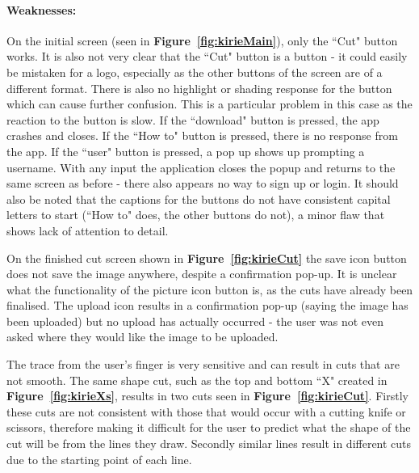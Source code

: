 \documentclass[11pt]{article}
\begin{document}
                
                \paragraph{Weaknesses:}
                On the initial screen (seen in \textbf{Figure~\ref{fig:kirieMain}}), only the ``Cut" button works. It is also not very clear that the ``Cut" button is a button - it could easily be  mistaken for a logo, especially as the other buttons of the screen are of a different format. There is also no highlight or shading response for the button which can cause further confusion. This is a particular problem in this case as the reaction to the button is slow. If the ``download" button is pressed, the app crashes and closes. If the ``How to" button is pressed, there is no response from the app. If the ``user" button is pressed, a pop up shows up prompting a username. With any input the application closes the popup and returns to the same screen as before - there also appears no way to sign up or login. It should also be noted that the captions for the buttons do not have consistent capital letters to start (``How to" does, the other buttons do not), a minor flaw that shows lack of attention to detail.
                
                On the finished cut screen shown in \textbf{Figure~\ref{fig:kirieCut}} the save icon button does not save the image anywhere, despite a confirmation pop-up. It is unclear what the functionality of the picture icon button is, as the cuts have already been finalised. The upload icon results in a confirmation pop-up (saying the image has been uploaded) but no upload has actually occurred - the user was not even asked where they would like the image to be uploaded. 
                
                The trace from the user's finger is very sensitive and can result in cuts that are not smooth. The same shape cut, such as the top and bottom ``X" created in \textbf{Figure~\ref{fig:kirieXs}}, results in two cuts seen in \textbf{Figure~\ref{fig:kirieCut}}. Firstly these cuts are not consistent with those that would occur with a cutting knife or scissors, therefore making it difficult for the user to predict what the shape of the cut will be from the lines they draw. Secondly similar lines result in different cuts due to the starting point of each line.
                
\end{document}
